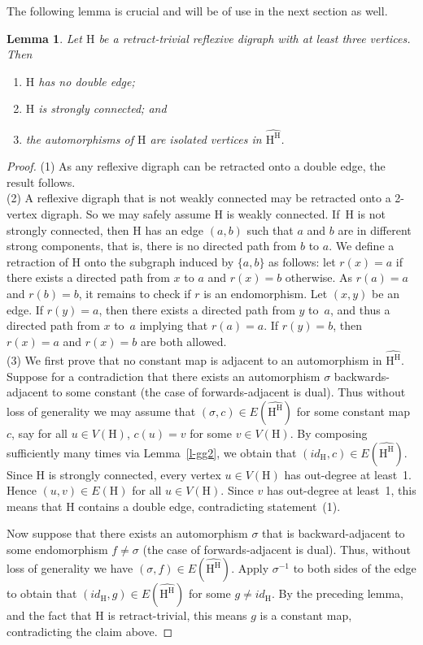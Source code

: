 \documentclass[a4paper,12pt]{article}
\newtheorem{lemma}{Lemma}
\theoremstyle{remark}
\renewcommand{\H}{\ensuremath{\mathrm{H}}}
\begin{document}
The following lemma is crucial and will be of use in the next section as well.

\begin{lemma}  Let $\H$ be a retract-trivial reflexive digraph with at least three vertices. Then 
\begin{enumerate}
\item $\H$ has no double edge;
\item $\H$ is strongly connected; and
\item the automorphisms of $\H$ are isolated vertices in  $\widehat{\H^{\H}}$. 
\end{enumerate}
\label{lem:Benoit-lemma}
\end{lemma}
\begin{proof} (1) As any reflexive digraph can be retracted onto a double edge, the result follows. \\[3pt]
(2) A reflexive digraph that is not weakly connected may be retracted onto a 2-vertex digraph. So we may safely assume $\H$ is weakly connected. If~$\H$ is not strongly connected, then $\H$ has an edge $(a,b)$ such that $a$ and $b$ are in different strong components, that is, there is no directed path from $b$ to $a$. We define a retraction of $\H$ onto the subgraph induced by $\{a,b\}$ as follows: let $r(x) = a$ if there exists a directed path from $x$ to $a$ and $r(x)=b$ otherwise. 
As $r(a)=a$ and $r(b)=b$, it remains to check if $r$ is an endomorphism. Let $(x,y)$ be an edge. If $r(y)=a$, then there exists
a directed path from $y$ to~$a$, and thus a directed path from $x$ to~$a$ implying that $r(a)=a$. If $r(y)=b$, then $r(x)=a$ 
and $r(x)=b$ are both allowed.\\[3pt]
(3) We first prove that no constant map is adjacent to an automorphism in $\widehat{\H^{\H}}$.
Suppose for a contradiction that  there exists an automorphism $\sigma$ backwards-adjacent to some constant (the case of forwards-adjacent is dual). Thus without loss of generality we may assume that 
$(\sigma,c) \in E(\widehat{\H^\H})$  for some constant map $c$, say for all $u\in V(\H)$, $c(u)=v$ for some $v\in V(\H)$.
By composing sufficiently many times via Lemma~\ref{l-gg2},  we obtain that $(id_\H,c) \in E(\widehat{\H^\H})$. 
Since $\H$ is strongly connected, every vertex $u\in V(\H)$ has out-degree at least~1.
Hence $(u,v) \in E(\H)$ for all $u \in V(\H)$.  Since $v$ has out-degree at least~1, this means that $\H$ contains a 
double edge, contradicting statement~(1).

Now suppose that there exists an automorphism $\sigma$ that is backward-adjacent to some endomorphism $f \neq \sigma$ (the case of forwards-adjacent is dual). Thus, without loss of generality we have $(\sigma,f) \in E(\widehat{\H^\H})$. Apply $\sigma^{-1}$ to both sides of the edge to obtain that $(id_\H,g) \in E(\widehat{\H^\H})$ for some $g \neq id_\H$.  By the preceding lemma, and the fact that $\H$ is retract-trivial, this means $g$ is a constant map, contradicting the claim above.   \end{proof}
\end{document}
